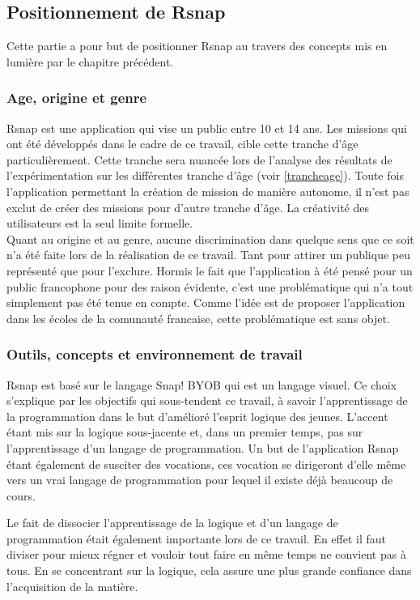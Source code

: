 \subsection{Positionnement de Rsnap}
Cette partie a pour but de positionner Rsnap au travers des concepts mis en lumière par le chapitre précédent.

\subsubsection{Age, origine et genre} 
Rsnap est une application qui vise un public entre 10 et 14 ans. Les missions qui ont été développés dans le cadre de ce travail, cible cette tranche d'âge particulièrement. Cette tranche sera nuancée lors de l'analyse des résultats de l'expérimentation sur les différentes tranche d'âge (voir \ref{trancheage}). %
Toute fois l'application permettant la création de mission de manière autonome, il n'est pas exclut de créer des missions pour d'autre tranche d'âge. La créativité des utilisateurs est la seul limite formelle.\\

Quant au origine et au genre, aucune discrimination dans quelque sens que ce soit n'a été faite lors de la réalisation de ce travail. Tant pour attirer un publique peu représenté que pour l'exclure. Hormis le fait que l'application à été pensé pour un public francophone pour des raison évidente, c'est une problématique qui n'a tout simplement pas été tenue en compte. Comme l'idée est de proposer l'application dans les écoles de la comunauté francaise, cette problématique est sans objet.

\subsubsection{Outils, concepts et environnement de travail} 
Rsnap est basé sur le langage Snap! BYOB qui est un langage visuel. Ce choix s'explique par les objectifs qui sous-tendent ce travail, à savoir l'apprentissage de la programmation dans le but d'amélioré l'esprit logique des jeunes. L'accent étant mis sur la logique sous-jacente et, dans un premier temps, pas sur l'apprentissage d'un langage de programmation. Un but de l'application Rsnap étant également de susciter des vocations, ces vocation se dirigeront d'elle même vers un vrai langage de programmation pour lequel il existe déjà beaucoup de cours. 

Le fait de dissocier l'apprentissage de la logique et d'un langage de programmation était également importante lors de ce travail. En effet il faut diviser pour mieux régner et vouloir tout faire en même temps ne convient pas à tous. En se concentrant sur la logique, cela assure une plus grande confiance dans l'acquisition de la matière.

